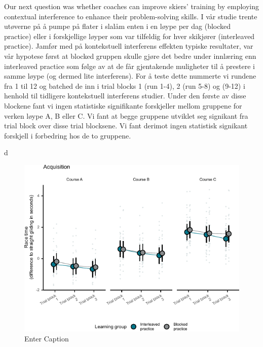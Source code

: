 Our next question was whether coaches can improve skiers' training by employing contextual interference to enhance their problem-solving skills. I vår studie trente utøverne på å pumpe på flater i slalåm enten i en løype per dag (blocked practice) eller i forskjellige løyper som var tilfeldig for hver skikjører (interleaved practice). Jamfør med på kontekstuell interferens effekten typiske resultater, var vår hypotese først at blocked gruppen skulle gjøre det bedre under innlæring enn interleaved practice som følge av at de får gjentakende muligheter til å prestere i samme løype (og dermed lite interferens). For å teste dette nummerte vi rundene fra 1 til 12 og batched de inn i trial blocks 1 (run 1-4), 2 (run 5-8) og (9-12) i henhold til tidligere kontekstuell interferens studier. Under den første av disse blockene fant vi ingen statistiske signifikante forskjeller mellom gruppene for verken løype A, B eller C. Vi fant at begge gruppene utviklet seg signikant fra trial block over disse trial blocksene. Vi fant derimot ingen statistisk signikant forskjell i forbedring hos de to gruppene. 

d\begin{figure}
    \centering
    \includegraphics[width=1\linewidth]{figure/figure_results_ci_acquisition.pdf}
    \caption{Enter Caption}
    \label{fig:enter-label}
\end{figure}
